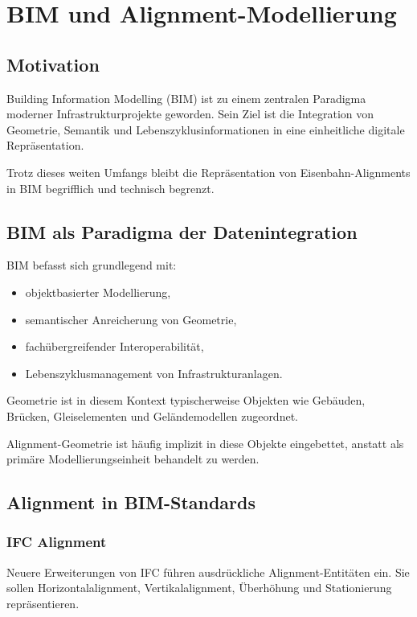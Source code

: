 \chapter{BIM und Alignment-Modellierung}

\section*{Motivation}

Building Information Modelling (BIM) ist zu einem zentralen Paradigma
moderner Infrastrukturprojekte geworden. Sein Ziel ist die Integration
von Geometrie, Semantik und Lebenszyklusinformationen in eine einheitliche
digitale Repräsentation.

Trotz dieses weiten Umfangs bleibt die Repräsentation von
Eisenbahn-Alignments in BIM begrifflich und technisch begrenzt.

\section{BIM als Paradigma der Datenintegration}

BIM befasst sich grundlegend mit:
\begin{itemize}
\item objektbasierter Modellierung,
\item semantischer Anreicherung von Geometrie,
\item fachübergreifender Interoperabilität,
\item Lebenszyklusmanagement von Infrastrukturanlagen.
\end{itemize}

Geometrie ist in diesem Kontext typischerweise Objekten wie Gebäuden,
Brücken, Gleiselementen und Geländemodellen zugeordnet.

Alignment-Geometrie ist häufig implizit in diese Objekte eingebettet,
anstatt als primäre Modellierungseinheit behandelt zu werden.

\section{Alignment in BIM-Standards}

\subsection{IFC Alignment}

Neuere Erweiterungen von IFC führen ausdrückliche Alignment-Entitäten ein.
Sie sollen Horizontalalignment, Vertikalalignment, Überhöhung und
Stationierung repräsentieren.

